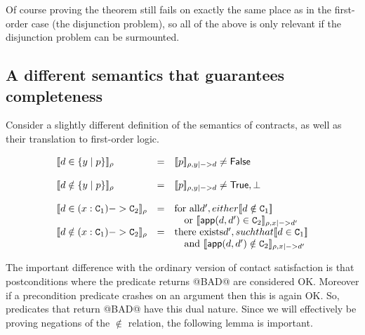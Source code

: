 \documentclass[preprint]{sigplanconf}
\begin{document}
Of course proving the theorem still fails on exactly the same place as
in the first-order case (the disjunction problem), so all of the above is only 
relevant if the disjunction problem can be surmounted.

\subsection{A different semantics that guarantees completeness}\label{ssect:bad-ok}

Consider a slightly different definition of the semantics of
contracts, as well as their translation to first-order logic.

\[\begin{array}{lcl}
  \dbrace{d \in \{ y \mid p\}}_\rho     & = & \dbrace{p}_{\rho,y |-> d} \neq \injKZ{False} \\ \\

  \dbrace{d \notin \{ y \mid p \}}_\rho & = & \dbrace{p}_{\rho,y |-> d} \neq \injKZ{True},\bot \\ \\

  \dbrace{d \in (x:\Ct_1) -> \Ct_2}_\rho & = & \text{for all} d', either \dbrace{d \notin \Ct_1} \\ 
                                        &   & \quad \text{or }\dbrace{\dapp(d,d') \in \Ct_2}_{\rho,x|->d'} \\

  \dbrace{d \notin (x:\Ct_1) -> \Ct_2}_\rho & = & \text{there exists} d', such that \dbrace{d \in \Ct_1} \\ 
                                        &   & \quad \text{and }\dbrace{\dapp(d,d') \notin \Ct_2}_{\rho,x|->d'} \\
\end{array}\]

The important difference with the ordinary version of contact satisfaction is 
that postconditions where the predicate returns @BAD@ are considered OK. 
Moreover if a precondition predicate crashes on an argument then this is again 
OK. So, predicates that return @BAD@ have this dual nature. Since we will effectively 
be proving negations of the $\notin$ relation, the following lemma is important.
\end{document}
